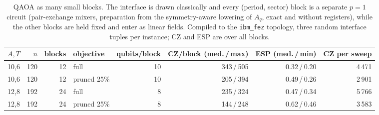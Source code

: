 \begin{table}[t]
\centering\footnotesize\setlength{\tabcolsep}{3.5pt}
\caption{ QAOA as many small blocks. The interface is drawn classically and every (period, sector) block is a separate $p=1$ circuit (pair-exchange mixers, preparation from the symmetry-aware lowering of $A_q$, exact and without registers), while the other blocks are held fixed and enter as linear fields. Compiled to the \texttt{ibm\_fez} topology, three random interface tuples per instance; CZ and ESP are over all blocks.}\label{tab:large_blocks}
\begin{tabular}{lrrlrrrr}
\toprule
$A,T$ & $n$ & blocks & objective & qubits/block & CZ/block (med.\,/\,max) & ESP (med.\,/\,min) & CZ per sweep\\
\midrule
10,6 & 120 & 12 & full & 10 & 343\,/\,505 & 0.32\,/\,0.20 & 4\,471\\
10,6 & 120 & 12 & pruned 25\% & 10 & 205\,/\,394 & 0.49\,/\,0.26 & 2\,901\\
12,8 & 192 & 24 & full & 8 & 235\,/\,324 & 0.47\,/\,0.34 & 5\,766\\
12,8 & 192 & 24 & pruned 25\% & 8 & 144\,/\,248 & 0.62\,/\,0.46 & 3\,583\\
\bottomrule
\end{tabular}
\end{table}
